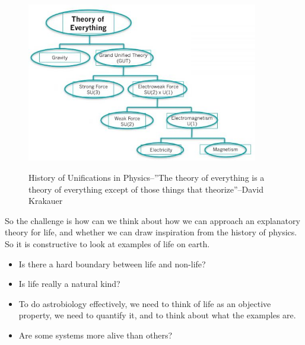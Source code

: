 \documentclass[]{article}
\begin{document}
\begin{figure}[H]
	\caption[History of Unifications in Physics]{History of Unifications in Physics--''The theory of everything is a theory of everything except of those things that theorize''--David Krakauer}
	\includegraphics[width=0.9\textwidth]{Unifications}\label{fig:physics:unifications}
\end{figure}
So the challenge is how can we think about how we can approach an explanatory theory for life, and whether we can draw inspiration from the history of physics. So it is constructive to look at examples of life on earth. 
\begin{itemize}
	\item Is there a hard boundary between life and non-life?
	\item Is life really a natural kind?
	\item To do astrobiology effectively, we need to think of life as an objective property, we need to quantify it, and to think about what the examples are.
	\item Are some systems more alive than others?
\end{itemize}
\end{document}
